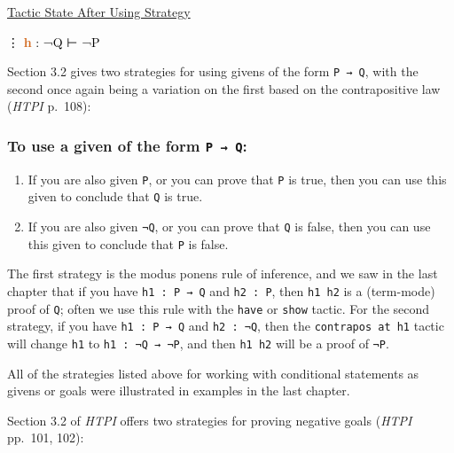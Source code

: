 \documentclass[
  letterpaper,
  DIV=11,
  numbers=noendperiod]{scrreprt}
\newenvironment{Shaded}{\begin{snugshade}}{\end{snugshade}}
\newcommand{\InformationTok}[1]{\textcolor[rgb]{0.37,0.37,0.37}{#1}}
\newcommand{\NormalTok}[1]{\textcolor[rgb]{0.00,0.23,0.31}{#1}}
\newcommand{\SpecialCharTok}[1]{\textcolor[rgb]{0.37,0.37,0.37}{#1}}
\providecommand{\tightlist}{%
  \setlength{\itemsep}{0pt}\setlength{\parskip}{0pt}}\usepackage{longtable,booktabs,array}
\renewcommand{\NormalTok}[1]{\textcolor[HTML]{000000}{#1}}
\renewcommand{\SpecialCharTok}[1]{}
\renewcommand{\InformationTok}[1]{\textcolor[HTML]{D2691E}{\textbf{#1}}}
\newcommand{\nobreakShaded}{\renewenvironment{Shaded}
	{\begin{tcolorbox}[frame hidden, enhanced, interior hidden, boxrule=0pt,
		borderline west={3pt}{0pt}{shadecolor}, sharp corners]}
	{\end{tcolorbox}}}
\newenvironment{aft}
	{\nobreakShaded\begin{minipage}[t]{0.475\textwidth}
		\uline{Tactic State After Using Strategy}}
	{\end{minipage}}
\theoremstyle{remark}
\begin{document}
\begin{aft}

\begin{Shaded}
\begin{Highlighting}[]
\SpecialCharTok{\textgreater{}\textgreater{}}\NormalTok{ ⋮}
\InformationTok{h }\NormalTok{: ¬Q}
\NormalTok{⊢ ¬P}
\end{Highlighting}
\end{Shaded}

\end{aft}

Section 3.2 gives two strategies for using givens of the form
\texttt{P\ →\ Q}, with the second once again being a variation on the
first based on the contrapositive law (\emph{HTPI} p.~108):

\hypertarget{to-use-a-given-of-the-form-p-q}{%
\subsubsection{\texorpdfstring{To use a given of the form
\texttt{P\ →\ Q}:}{To use a given of the form P → Q:}}\label{to-use-a-given-of-the-form-p-q}}

\begin{enumerate}
\def\labelenumi{\arabic{enumi}.}
\tightlist
\item
  If you are also given \texttt{P}, or you can prove that \texttt{P} is
  true, then you can use this given to conclude that \texttt{Q} is true.
\item
  If you are also given \texttt{¬Q}, or you can prove that \texttt{Q} is
  false, then you can use this given to conclude that \texttt{P} is
  false.
\end{enumerate}

The first strategy is the modus ponens rule of inference, and we saw in
the last chapter that if you have \texttt{h1\ :\ P\ →\ Q} and
\texttt{h2\ :\ P}, then \texttt{h1\ h2} is a (term-mode) proof of
\texttt{Q}; often we use this rule with the \texttt{have} or
\texttt{show} tactic. For the second strategy, if you have
\texttt{h1\ :\ P\ →\ Q} and \texttt{h2\ :\ ¬Q}, then the
\texttt{contrapos\ at\ h1} tactic will change \texttt{h1} to
\texttt{h1\ :\ ¬Q\ →\ ¬P}, and then \texttt{h1\ h2} will be a proof of
\texttt{¬P}.

All of the strategies listed above for working with conditional
statements as givens or goals were illustrated in examples in the last
chapter.

Section 3.2 of \emph{HTPI} offers two strategies for proving negative
goals (\emph{HTPI} pp.~101, 102):
\end{document}

